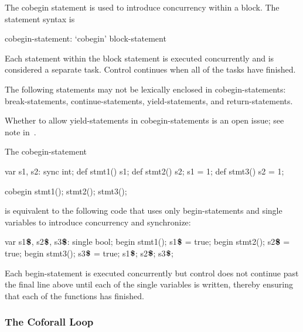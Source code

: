 The cobegin statement is used to introduce concurrency within a
block.  The  statement syntax is
\begin{syntax}
cobegin-statement:
  `cobegin' block-statement
\end{syntax}
Each statement within the block statement is executed concurrently and
is considered a separate task.  Control continues when all of the
tasks have finished.

The following statements may not be lexically enclosed in
cobegin-statements: break-statements, continue-statements,
yield-statements, and return-statements.

\begin{openissue}
Whether to allow yield-statements in cobegin-statements is an open
issue; see note in~.
\end{openissue}

\begin{example}
The cobegin-statement
\begin{chapelpre}
var s1, s2: sync int;
def stmt1() { s1; }
def stmt2() { s2; s1 = 1; }
def stmt3() { s2 = 1; }
\end{chapelpre}
\begin{chapel}
cobegin {
  stmt1();
  stmt2();
  stmt3();
}
\end{chapel}
is equivalent to the following code that uses only begin-statements
and single variables to introduce concurrency and synchronize:
\begin{chapel}
var s1$\mbox{{\bf \$}}$, s2$\mbox{{\bf \$}}$, s3$\mbox{{\bf \$}}$: single bool;
begin { stmt1(); s1$\mbox{{\bf \$}}$ = true; }
begin { stmt2(); s2$\mbox{{\bf \$}}$ = true; }
begin { stmt3(); s3$\mbox{{\bf \$}}$ = true; }
s1$\mbox{{\bf \$}}$; s2$\mbox{{\bf \$}}$; s3$\mbox{{\bf \$}}$;
\end{chapel}
\begin{chapeloutput}
\end{chapeloutput}
Each begin-statement is executed concurrently but control does not
continue past the final line above until each of the single variables
is written, thereby ensuring that each of the functions has finished.
\end{example}

\subsubsection{The Coforall Loop}
\label{Coforall}

